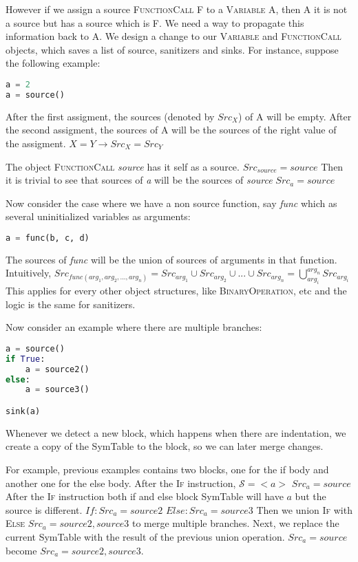 However if we assign a source \textsc{FunctionCall} F to a \textsc{Variable} A, then A it is not a source
but has a source which is F. We need a way to propagate this information back to A.
We design a change to our \textsc{Variable} and \textsc{FunctionCall} objects, which saves a list of source,
sanitizers and sinks. For instance, suppose the following example:

\begin{lstlisting}[language=Python]
a = 2
a = source()
\end{lstlisting}

After the first assigment, the sources (denoted by $Src_X$) of A will be empty.
After the second assigment, the sources of A will be the sources of the right value of the assigment.
$X = Y \rightarrow Src_X = Src_Y$

The object \textsc{FunctionCall} \textit{source} has it self as a source. $Src_{source} = source$
Then it is trivial to see that sources of \textit{a} will be the sources of \textit{source} $Src_a = source$

Now consider the case where we have a non source function, say \textit{func} which as several uninitialized
variables as arguments:

\begin{lstlisting}[language=Python]
a = func(b, c, d)
\end{lstlisting}

The sources of \textit{func} will be the union of sources of arguments in that function.
Intuitively, $Src_{func(arg_1, arg_2, ..., arg_n)} = Src_{arg_1} \cup Src_{arg_2} \cup ... \cup Src_{arg_n} = \bigcup_{arg_i}^{arg_n} Src_{arg_i} $
This applies for every other object structures, like \textsc{BinaryOperation}, etc and the logic is the
same for sanitizers.

Now consider an example where there are multiple branches:

\begin{lstlisting}[language=Python]
a = source()
if True:
    a = source2()
else:
    a = source3()

sink(a)
\end{lstlisting}

Whenever we detect a new block, which happens when there are indentation, we create a copy of the SymTable
to the block, so we can later merge changes.

For example, previous examples contains two blocks, one for the if body and another one for the else body.
After the \textsc{If} instruction, $\mathcal{S} = <a>$ $Src_a = source$
After the \textsc{If} instruction both if and else block SymTable will have $a$ but the source is different.
$If: Src_a = source2$ $Else: Src_a = source3$
Then we union \textsc{If} with \textsc{Else} $Src_a = source2, source3$ to merge multiple branches.
Next, we replace the current SymTable with the result of the previous union operation. $Src_a = source$ become
$Src_a = source2, source3$.

